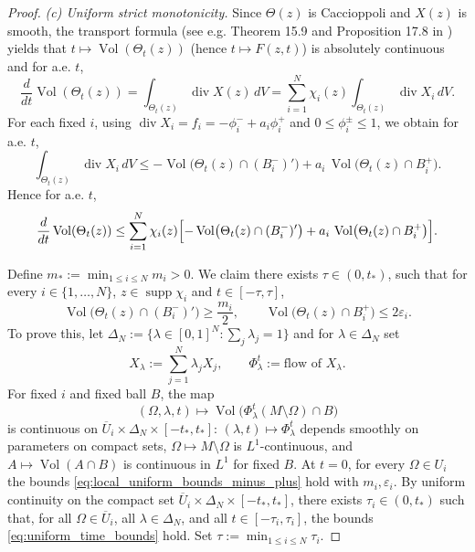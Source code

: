 \documentclass[12pt,english]{article}
\theoremstyle{definition}
\begin{document}
\begin{proof}
\smallskip
\noindent\emph{(c) Uniform strict monotonicity.}
Since $\Theta(z)$ is Caccioppoli and $X(z)$ is smooth, the transport formula (see e.g. Theorem 15.9 and Proposition 17.8 in \cite{Maggi})
yields that $t\mapsto \operatorname{Vol}(\Theta_t(z))$ (hence $t\mapsto F(z,t)$) is absolutely continuous and for a.e. $t$,
\[
\frac{d}{dt}\operatorname{Vol}(\Theta_t(z))=\int_{\Theta_t(z)} \operatorname{div} X(z)\,dV
=\sum_{i=1}^N \chi_i(z)\int_{\Theta_t(z)} \operatorname{div} X_i\,dV.
\]
For each fixed $i$, using $\operatorname{div} X_i=f_i=-\phi_i^-+a_i\phi_i^+$ and $0\le \phi_i^\pm\le 1$, we obtain for a.e. $t$,
\[
\int_{\Theta_t(z)} \operatorname{div} X_i\,dV
\le -\operatorname{Vol}\bigl(\Theta_t(z)\cap (B_i^-)'\bigr)+a_i\,\operatorname{Vol}\bigl(\Theta_t(z)\cap B_i^+\bigr).
\]
Hence for a.e. $t$,
\begin{equation}\label{eq:global_dvol_ineq}
\frac{d}{dt}\operatorname{Vol}(\Theta_t(z))
\le \sum_{i=1}^N \chi_i(z)\Bigl[-\operatorname{Vol}\bigl(\Theta_t(z)\cap (B_i^-)'\bigr)
+a_i\,\operatorname{Vol}\bigl(\Theta_t(z)\cap B_i^+\bigr)\Bigr].
\end{equation}

Define $m_\ast:=\min_{1\le i\le N} m_i>0$. We claim there exists $\tau\in(0,t_\ast)$, such that for every $i \in \{1, \ldots, N\}$, $z\in\operatorname{supp}\chi_i$ and $t\in[-\tau,\tau]$,
\begin{equation}\label{eq:uniform_time_bounds}
\operatorname{Vol}\bigl(\Theta_t(z)\cap (B_i^-)'\bigr)\ge \frac{m_i}{2},
\qquad
\operatorname{Vol}\bigl(\Theta_t(z)\cap B_i^+\bigr)\le 2\varepsilon_i.
\end{equation}
To prove this, let $\Delta_N:=\{\lambda\in[0,1]^N:\sum_j\lambda_j=1\}$ and for $\lambda\in\Delta_N$ set
\[
X_\lambda:=\sum_{j=1}^N \lambda_j X_j,
\qquad
\Phi_\lambda^t:=\text{flow of }X_\lambda.
\]
For fixed $i$ and fixed ball $B$, the map
\[
(\Omega,\lambda,t)\longmapsto \operatorname{Vol}\bigl(\Phi_\lambda^t(M\setminus\Omega)\cap B\bigr)
\]
is continuous on $\overline U_i\times\Delta_N\times[-t_\ast,t_\ast]$:
$(\lambda,t)\mapsto \Phi_\lambda^t$ depends smoothly on parameters on compact sets,
$\Omega\mapsto M\setminus\Omega$ is $L^1$-continuous, and $A\mapsto \operatorname{Vol}(A\cap B)$ is continuous in $L^1$ for fixed $B$.
At $t=0$, for every $\Omega\in U_i$ the bounds \eqref{eq:local_uniform_bounds_minus_plus} hold with $m_i,\varepsilon_i$.
By uniform continuity on the compact set $\overline U_i\times\Delta_N\times[-t_\ast,t_\ast]$, there exists $\tau_i\in(0,t_\ast)$
such that, for all $\Omega\in \overline U_i$, all $\lambda\in\Delta_N$, and all $t\in[-\tau_i,\tau_i]$,
the bounds \eqref{eq:uniform_time_bounds} hold.
Set $\tau:=\min_{1\le i\le N}\tau_i$.


\end{proof}
\end{document}

